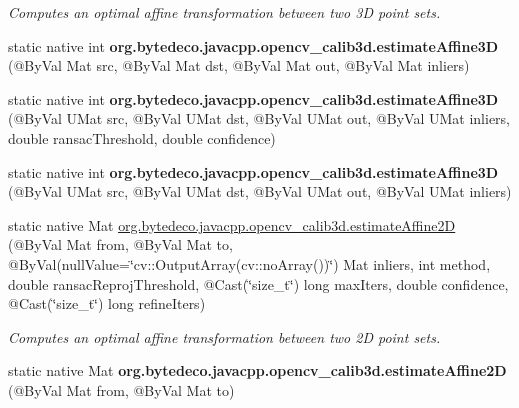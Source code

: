 \begin{DoxyCompactItemize}
\begin{DoxyCompactList}\small\item\em Computes an optimal affine transformation between two 3D point sets. \end{DoxyCompactList}\item 
\mbox{\label{group__calib3d_gae5e6ec58493157020514a52052ae1735}} 
static native int {\bfseries org.\+bytedeco.\+javacpp.\+opencv\+\_\+calib3d.\+estimate\+Affine3D} (@By\+Val Mat src, @By\+Val Mat dst, @By\+Val Mat out, @By\+Val Mat inliers)
\item 
\mbox{\label{group__calib3d_gac212381f062f3be447e802f607527ec1}} 
static native int {\bfseries org.\+bytedeco.\+javacpp.\+opencv\+\_\+calib3d.\+estimate\+Affine3D} (@By\+Val U\+Mat src, @By\+Val U\+Mat dst, @By\+Val U\+Mat out, @By\+Val U\+Mat inliers, double ransac\+Threshold, double confidence)
\item 
\mbox{\label{group__calib3d_gaa1bc98d9c83e43d59cac434db915b009}} 
static native int {\bfseries org.\+bytedeco.\+javacpp.\+opencv\+\_\+calib3d.\+estimate\+Affine3D} (@By\+Val U\+Mat src, @By\+Val U\+Mat dst, @By\+Val U\+Mat out, @By\+Val U\+Mat inliers)
\item 
static native Mat \hyperlink{group__calib3d_ga3ac5c98614a2c26448c68e407388473f}{org.\+bytedeco.\+javacpp.\+opencv\+\_\+calib3d.\+estimate\+Affine2D} (@By\+Val Mat from, @By\+Val Mat to, @By\+Val(null\+Value=\char`\"{}cv\+::\+Output\+Array(cv\+::no\+Array())\char`\"{}) Mat inliers, int method, double ransac\+Reproj\+Threshold, @Cast(\char`\"{}size\+\_\+t\char`\"{}) long max\+Iters, double confidence, @Cast(\char`\"{}size\+\_\+t\char`\"{}) long refine\+Iters)
\begin{DoxyCompactList}\small\item\em Computes an optimal affine transformation between two 2D point sets. \end{DoxyCompactList}\item 
\mbox{\label{group__calib3d_gaf8f606801c91737cdd734c213fe97a85}} 
static native Mat {\bfseries org.\+bytedeco.\+javacpp.\+opencv\+\_\+calib3d.\+estimate\+Affine2D} (@By\+Val Mat from, @By\+Val Mat to)
\item 
\mbox{\label{group__calib3d_gaee1e19cde4924fe15174991e23f50191}} 

\end{DoxyCompactItemize}
